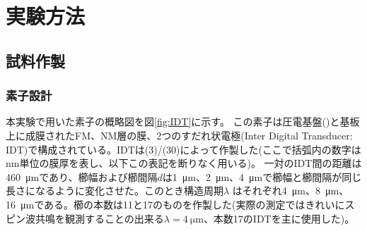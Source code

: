 \documentclass[dvipdfmx,11pt]{jsreport}
\numberwithin{equation}{chapter}
\numberwithin{table}{chapter}
\begin{document}
\chapter{実験方法}
\section{試料作製}
\subsection{素子設計}
本実験で用いた素子の概略図を図\ref{fig:IDT}に示す。
この素子は圧電基盤()と基板上に成膜されたFM、NM層の膜、2つのすだれ状電極(Inter Digital Transducer: IDT)で構成されている。IDTは(3)/(30)によって作製した(ここで括弧内の数字は\si{\nano \metre}単位の膜厚を表し、以下この表記を断りなく用いる)。
一対のIDT間の距離は\SI{460}{\micro \metre}であり、櫛幅および櫛間隔$d$は\SI{1}{\micro \metre}、\SI{2}{\micro \metre}、\SI{4}{\micro \metre}で櫛幅と櫛間隔が同じ長さになるように変化させた。このとき構造周期$\lambda$ はそれぞれ\SI{4}{\micro \metre}、\SI{8}{\micro \metre}、\SI{16}{\micro \metre}である。櫛の本数は11と17のものを作製した(実際の測定ではきれいにスピン波共鳴を観測することの出来る$\lambda=\SI{4}{\micro \metre}$、本数17のIDTを主に使用した)。
\end{document}
